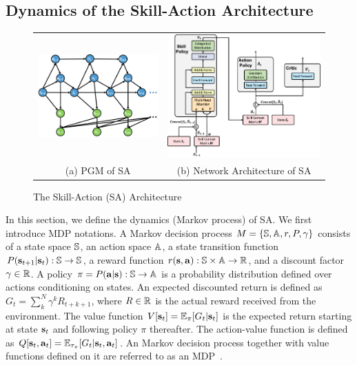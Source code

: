 \subsection{Dynamics of the Skill-Action Architecture}
\label{sec:sa_PGM}

\begin{figure}[thb]
  \centering
  \begin{tabular}{cc}
    \includegraphics[width=0.45\linewidth]{./Part1/figures/doe.png}&
                                                              \includegraphics[width=0.45\linewidth]{./Part1/figures/sa_attn_net.png}\\
    {\small (a) PGM of SA}&
                            {\small (b) Network
                            Architecture of SA}\\
   
  \end{tabular}\vspace{-2mm}
  \caption{\label{fig:sa_net} The Skill-Action (SA) Architecture}
  \vspace{-6mm}
\end{figure}

In this section, we define the dynamics (Markov process) of SA.
We first introduce MDP notations. A Markov decision process
$M=\{{\mathbb{S}},{\mathbb{A}},r,P,\gamma\}$ consists of a state space ${\mathbb{S}}$, an
action space ${\mathbb{A}}$, a state transition function
$P({\mathbf{s}}_{t+1}|{\mathbf{s}}_t): {\mathbb{S}}\rightarrow{\mathbb{S}}$, a reward function
$r({\mathbf{s}},{\mathbf{a}}):{\mathbb{S}}\times{\mathbb{A}}\rightarrow{\mathbb{R}}$, and a discount factor
$\gamma\in{\mathbb{R}}$. A policy $\pi=P({\mathbf{a}}|{\mathbf{s}}):{\mathbb{S}}\rightarrow {\mathbb{A}}$ is
a probability distribution defined over actions conditioning on
states. An expected discounted return is defined as $G_t =
\sum_k^N\gamma^kR_{t+k+1}$, where $R\in{\mathbb{R}}$ is the actual reward
received from the environment. The value function
$V[{\mathbf{s}}_t]=\mathbb{E}_{\pi}[G_t|{\mathbf{s}}_t]$ is the expected return starting
at state ${\mathbf{s}}_t$ and following policy $\pi$ thereafter. The
action-value function is defined as $Q[{\mathbf{s}}_t,{\mathbf{a}}_t]=
\mathbb{E}_{\tau_\pi}[G_t|{\mathbf{s}}_t,{\mathbf{a}}_t]$. An Markov decision process
together with value functions defined on it are referred to as an
MDP~\cite{puterman2014markov}.

